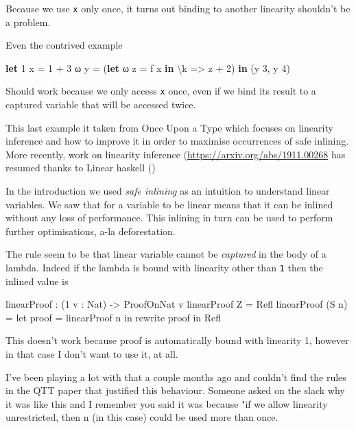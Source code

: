 \documentclass[
]{article}
\newenvironment{Shaded}{}{}
\newcommand{\DecValTok}[1]{\textcolor[rgb]{0.25,0.63,0.44}{#1}}
\newcommand{\KeywordTok}[1]{\textcolor[rgb]{0.00,0.44,0.13}{\textbf{#1}}}
\newcommand{\NormalTok}[1]{#1}
\newcommand{\OperatorTok}[1]{\textcolor[rgb]{0.40,0.40,0.40}{#1}}
\newcommand{\OtherTok}[1]{\textcolor[rgb]{0.00,0.44,0.13}{#1}}
\begin{document}
Because we use \texttt{x} only once, it turns out binding to another
linearity shouldn't be a problem.

Even the contrived example

\begin{Shaded}
\begin{Highlighting}[]
\KeywordTok{let} \DecValTok{1}\NormalTok{ x }\OtherTok{=} \DecValTok{1} \OperatorTok{+} \DecValTok{3}
\NormalTok{    ω y }\OtherTok{=}\NormalTok{ (}\KeywordTok{let}\NormalTok{ ω z }\OtherTok{=}\NormalTok{ f x }\KeywordTok{in}\NormalTok{ \textbackslash{}k }\OtherTok{=\textgreater{}}\NormalTok{ z }\OperatorTok{+} \DecValTok{2}\NormalTok{) }\KeywordTok{in}
\NormalTok{    (y }\DecValTok{3}\NormalTok{, y }\DecValTok{4}\NormalTok{)}
\end{Highlighting}
\end{Shaded}

Should work because we only access \texttt{x} once, even if we bind its
result to a captured variable that will be accessed twice.

This last example it taken from Once Upon a Type which focuses on
linearity inference and how to improve it in order to maximise
occurrences of safe inlining. More recently, work on linearity inference
(\url{https://arxiv.org/abs/1911.00268} has resumed thanks to Linear
haskell ()

In the introduction we used \emph{safe inlining} as an intuition to
understand linear variables. We saw that for a variable to be linear
means that it can be inlined without any loss of performance. This
inlining in turn can be used to perform further optimisations, a-la
deforestation.

The rule seem to be that linear variable cannot be \emph{captured} in
the body of a lambda. Indeed if the lambda is bound with linearity other
than \texttt{1} then the inlined value is

linearProof : (1 v : Nat) -\textgreater{} ProofOnNat v linearProof Z =
Refl linearProof (S n) = let proof = linearProof n in rewrite proof in
Refl

This doesn't work because proof is automatically bound with linearity 1,
however in that case I don't want to use it, at all.

I've been playing a lot with that a couple months ago and couldn't find
the rules in the QTT paper that justified this behaviour. Someone asked
on the slack why it was like this and I remember you said it was because
"if we allow linearity unrestricted, then n (in this case) could be used
more than once.
\end{document}
